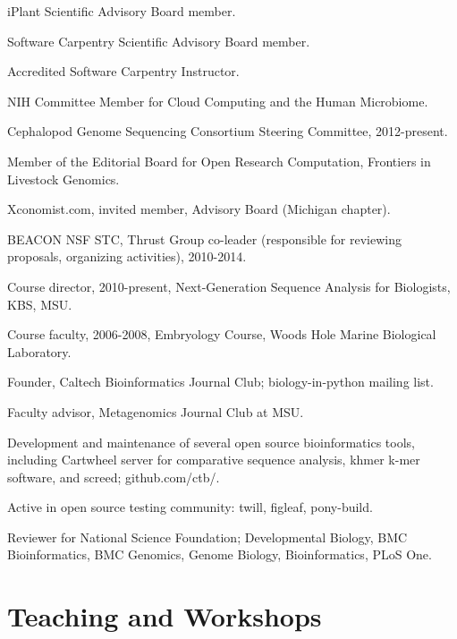 \documentclass[margin,line]{resume}
\begin{document}
\begin{resume}
\begin{list1}
\item[] iPlant Scientific Advisory Board member.
\item[] Software Carpentry Scientific Advisory Board member.
\item[] Accredited Software Carpentry Instructor.
\item[] NIH Committee Member for Cloud Computing and the Human Microbiome.
\item[] Cephalopod Genome Sequencing Consortium Steering Committee, 2012-present.
\item[] Member of the Editorial Board for Open Research Computation,
Frontiers in Livestock Genomics.
\item[] Xconomist.com, invited member, Advisory Board (Michigan chapter).
\item[] BEACON NSF STC, Thrust Group co-leader (responsible for reviewing
proposals, organizing activities), 2010-2014.
\item[] Course director, 2010-present, Next-Generation Sequence Analysis for Biologists, KBS, MSU.
\item[] Course faculty, 2006-2008, Embryology Course, Woods Hole Marine Biological Laboratory.
\item[] Founder, Caltech Bioinformatics Journal Club; biology-in-python
mailing list.
\item[] Faculty advisor, Metagenomics Journal Club at MSU.
\item[] Development and maintenance of several open source bioinformatics tools, including
Cartwheel server for comparative sequence analysis, khmer k-mer software,
and screed; github.com/ctb/.
\item[] Active in open source testing community: twill, figleaf, pony-build.
\item[] Reviewer for National Science Foundation; Developmental Biology, BMC Bioinformatics, BMC Genomics, Genome Biology, Bioinformatics, PLoS One.
\end{list1}

\newpage

\section{\mysidestyle Teaching and Workshops}

\begin{list1}


\end{list1}
\end{resume}
\end{document}
